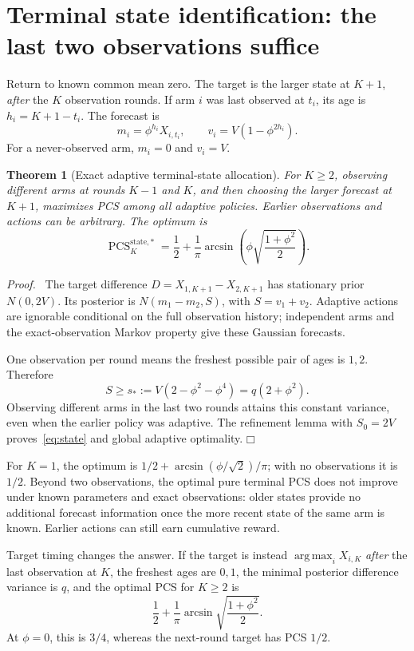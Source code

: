 \documentclass[11pt]{article}
\newtheorem{theorem}{Theorem}
\newenvironment{proof}{\par\noindent\textit{Proof.}\ }{\hfill$\mdlgwhtsquare$\par\medskip}
\newcommand{\argmax}{\operatorname*{arg\,max}}
\newcommand{\PCS}{\operatorname{PCS}}
\begin{document}
\section{Terminal state identification: the last two observations suffice}
Return to known common mean zero. The target is the larger state at $K+1$, \emph{after} the $K$ observation rounds. If arm $i$ was last observed at $t_i$, its age is $h_i=K+1-t_i$. The forecast is
\begin{equation}
m_i=\phi^{h_i}X_{i,t_i},\qquad
v_i=V(1-\phi^{2h_i}).
\end{equation}
For a never-observed arm, $m_i=0$ and $v_i=V$.

\begin{theorem}[Exact adaptive terminal-state allocation]
For $K\geq2$, observing different arms at rounds $K-1$ and $K$, and then choosing the larger forecast at $K+1$, maximizes PCS among all adaptive policies. Earlier observations and actions can be arbitrary. The optimum is
\begin{equation}
\boxed{\PCS_K^{\mathrm{state},*}
=\frac12+\frac1\pi\arcsin\left(
\phi\sqrt{\frac{1+\phi^2}{2}}\right).}
\label{eq:state}
\end{equation}
\end{theorem}
\begin{proof}
The target difference $D=X_{1,K+1}-X_{2,K+1}$ has stationary prior $N(0,2V)$. Its posterior is $N(m_1-m_2,S)$, with $S=v_1+v_2$. Adaptive actions are ignorable conditional on the full observation history; independent arms and the exact-observation Markov property give these Gaussian forecasts.

One observation per round means the freshest possible pair of ages is $1,2$. Therefore
\[
S\geq s_*:=V(2-\phi^2-\phi^4)=q(2+\phi^2).
\]
Observing different arms in the last two rounds attains this constant variance, even when the earlier policy was adaptive. The refinement lemma with $S_0=2V$ proves~\eqref{eq:state} and global adaptive optimality.
\end{proof}

For $K=1$, the optimum is $1/2+\arcsin(\phi/\sqrt2)/\pi$; with no observations it is $1/2$. Beyond two observations, the optimal pure terminal PCS does not improve under known parameters and exact observations: older states provide no additional forecast information once the more recent state of the same arm is known. Earlier actions can still earn cumulative reward.

Target timing changes the answer. If the target is instead $\argmax_iX_{i,K}$ \emph{after} the last observation at $K$, the freshest ages are $0,1$, the minimal posterior difference variance is $q$, and the optimal PCS for $K\geq2$ is
\begin{equation}
\frac12+\frac1\pi\arcsin\sqrt{\frac{1+\phi^2}{2}}.
\end{equation}
At $\phi=0$, this is $3/4$, whereas the next-round target has PCS $1/2$.
\end{document}

